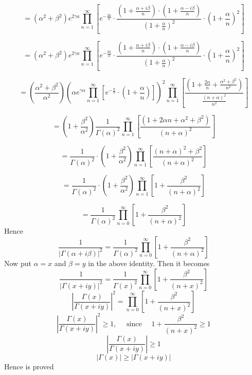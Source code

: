 $$
=\left(\alpha^{2}+\beta^{2}\right) e^{2 \gamma a} \prod_{n=1}^{\infty}\left[e^{-\frac{2 a}{n}} \cdot \frac{\left(1+\frac{\alpha+i \beta}{n}\right) \cdot\left(1+\frac{\alpha-i \beta}{n}\right)}{\left(1+\frac{\alpha}{n}\right)^{2}} \cdot\left(1+\frac{\alpha}{n}\right)^{2}\right]
$$

$$
=\left(\alpha^{2}+\beta^{2}\right) e^{2 \gamma a} \prod_{n=1}^{\infty}\left[e^{-\frac{2 a}{n}} \cdot \frac{\left(1+\frac{\alpha+i \beta}{n}\right) \cdot\left(1+\frac{\alpha-i \beta}{n}\right)}{\left(1+\frac{\alpha}{n}\right)^{2}} \cdot\left(1+\frac{\alpha}{n}\right)^{2}\right]
$$

$$
=\left(\frac{\alpha^{2}+\beta^{2}}{\alpha^{2}}\right)\left(\alpha e^{\gamma \alpha} \prod_{n=1}^{\infty}\left[e^{-\frac{a}{n}} \cdot\left(1+\frac{\alpha}{n}\right)\right]\right)^{2} \prod_{n=1}^{\infty}\left[\frac{\left(1+\frac{2 \alpha}{n}+\frac{\alpha^{2}+\beta^{2}}{n^{2}}\right)}{\frac{(n+\alpha)^{2}}{n^{2}}}\right]
$$


$$
=\left(1+\frac{\beta^{2}}{\alpha^{2}}\right) \frac{1}{\Gamma(\alpha)^{2}} \prod_{n=1}^{\infty}\left[\frac{\left(1+2 \alpha n+\alpha^{2}+\beta^{2}\right)}{(n+\alpha)^{2}}\right]
$$

$$
=\frac{1}{\Gamma(\alpha)^{2}} \cdot\left(1+\frac{\beta^{2}}{\alpha^{2}}\right) \prod_{n=1}^{\infty}\left[\frac{(n+\alpha)^{2}+\beta^{2}}{(n+\alpha)^{2}}\right]
$$

$$
=\frac{1}{\Gamma(\alpha)^{2}} \cdot\left(1+\frac{\beta^{2}}{\alpha^{2}}\right) \prod_{n=1}^{\infty}\left[1+\frac{\beta^{2}}{(n+\alpha)^{2}}\right]
$$

$$
=\frac{1}{\Gamma(\alpha)^{2}} \prod_{n=0}^{\infty}\left[1+\frac{\beta^{2}}{(n+\alpha)^{2}}\right]
$$
Hence
$$
\frac{1}{|\Gamma(\alpha+i \beta)|^{2}}=\frac{1}{\Gamma(\alpha)^{2}} \prod_{n=0}^{\infty}\left[1+\frac{\beta^{2}}{(n+\alpha)^{2}}\right]
$$
Now put $\alpha=x$ and $\beta=y$ in the above identity. Then it becomes
$$
\frac{1}{|\Gamma(x+i y)|^{2}}=\frac{1}{\Gamma(x)^{2}} \prod_{n=0}^{\infty}\left[1+\frac{\beta^{2}}{(n+x)^{2}}\right]
$$
$$
\left|\frac{\Gamma(x)}{\Gamma(x+i y)}\right|^{2}=\prod_{n=0}^{\infty}\left[1+\frac{\beta^{2}}{(n+x)^{2}}\right]
$$
$$
\left|\frac{\Gamma(x)}{\Gamma(x+i y)}\right|^{2} \geq 1, \quad \text { since }\quad 1+\frac{\beta^{2}}{(n+x)^{2}} \geq 1
$$
$$\left|\frac{\Gamma(x)}{\Gamma(x+i y)}\right| \geq 1$$
$$|\Gamma(x)| \geq|\Gamma(x+i y)|$$
Hence is proved






\newpage

